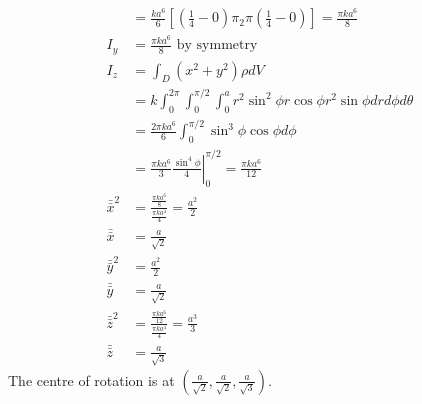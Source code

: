 \documentclass[fleqn,letterpaper]{report}
\begin{document}
\begin{example}
\begin{align*}
& = \frac{ka^6}{6} \left[ \left( \frac{1}{4} - 0 \right) \pi _
2\pi \left( \frac{1}{4} - 0 \right) \right] = \frac{\pi
ka^6}{8} \\
I_y & = \frac{\pi ka^6}{8} \text{ by symmetry} \\
I_z & = \int_D (x^2 + y^2) \rho dV \\
& = k \int_0^{2\pi} \int_0^{\pi/2} \int_0^a r^2 \sin^2 \phi r
\cos \phi r^2 \sin \phi dr d\phi d\theta \\
& = \frac{2\pi ka^6}{6} \int_0^{\pi/2} \sin^3 \phi \cos \phi
d\phi \\
& = \frac{\pi ka^6}{3} \left. \frac{\sin^4 \phi}{4}
\right|_0^{\pi/2} = \frac{\pi ka^6}{12} \\
\bar{\bar{x}}^2 & = \frac{\frac{\pi ka^6}{8}}{\frac{\pi
ka^4}{4}} = \frac{a^2}{2} \\
\bar{\bar{x}} & = \frac{a}{\sqrt{2}} \\
\bar{\bar{y}}^2 & = \frac{a^2}{2} \\
\bar{\bar{y}} & = \frac{a}{\sqrt{2}} \\
\bar{\bar{z}}^2 & = \frac{\frac{\pi ka^6}{12}}{\frac{\pi
ka^4}{4}} = \frac{a^3}{3} \\
\bar{\bar{z}} & = \frac{a}{\sqrt{3}}
\end{align*}
The centre of rotation is at $\left( \frac{a}{\sqrt{2}},
\frac{a}{\sqrt{2}}, \frac{a}{\sqrt{3}} \right)$.
\end{example}
\newpage
\end{document}

